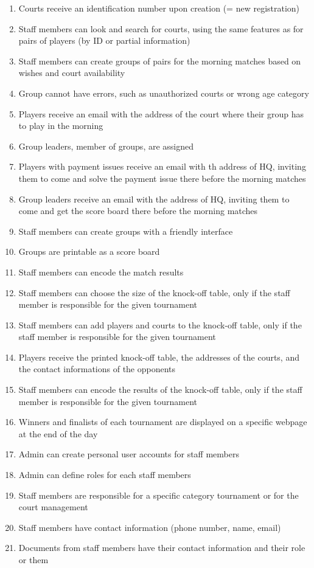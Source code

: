 \begin{enumerate}
    \item Courts receive an identification number upon creation (= new
        registration)
    \item Staff members can look and search for courts, using the same
        features as for pairs of players (by ID or partial information)
    \item Staff members can create groups of pairs for the morning
        matches based on wishes and court availability
    \item Group cannot have errors, such as unauthorized courts or wrong
        age category
    \item Players receive an email with the address of the court where
        their group has to play in the morning
    \item Group leaders, member of groups, are assigned
    \item Players with payment issues receive an email with th address
        of HQ, inviting them to come and solve the payment issue there
        before the morning matches
    \item Group leaders receive an email with the address of HQ,
        inviting them to come and get the score board there before the
        morning matches
    \item Staff members can create groups with a friendly interface
    \item Groups are printable as a score board
    \item Staff members can encode the match results
    \item Staff members can choose the size of the knock-off table, only
        if the staff member is responsible for the given tournament
    \item Staff members can add players and courts to the knock-off
        table, only if the staff member is responsible for the given
        tournament
    \item Players receive the printed knock-off table, the addresses of
        the courts, and the contact informations of the opponents
    \item Staff members can encode the results of the knock-off table,
        only if the staff member is responsible for the given tournament
    \item Winners and finalists of each tournament are displayed on a
        specific webpage at the end of the day
    \item Admin can create personal user accounts for staff members
    \item Admin can define roles for each staff members
    \item Staff members are responsible for a specific category
        tournament or for the court management 
    \item Staff members have contact information (phone number, name,
        email)
    \item Documents from staff members have their contact information
        and their role or them
\end{enumerate}

